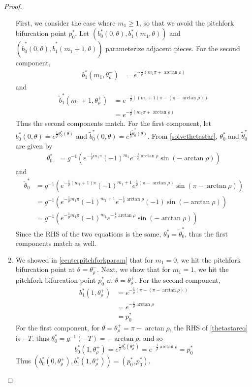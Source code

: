 \documentclass[thesis.tex]{subfiles}
\begin{document}
\begin{lemma}
\begin{proof}
\begin{enumerate}
	First, we consider the case where $m_1 \geq 1$, so that we avoid the pitchfork bifurcation point $p_0^*$. Let $(b^*_0(0, \theta), b^*_1(m_1, \theta))$ and $(\tilde{b}^*_0(0, \theta), \tilde{b}^*_1(m_1 + 1, \theta))$ parameterize adjacent pieces. For the second component,
	\begin{align*}
	b_1^*(m_1, \theta_\rho^-) &= e^{ -\frac{1}{\rho}(m_1 \pi + \arctan \rho) }
	\end{align*}
	and
	\begin{align*}
	\tilde{b}_1^*(m_1 + 1, \theta_\rho^+) 
	&= e^{ -\frac{1}{\rho}((m_1+1) \pi - (\pi - \arctan \rho)) } \\
	&= e^{ -\frac{1}{\rho}(m_1 \pi + \arctan \rho) }
	\end{align*}
	Thus the second components match. For the first component, let $b_0^*(0, \theta) = e^{ \frac{1}{\rho} \theta_0^*(\theta) }$ and $\tilde{b}_0^*(0, \theta) = e^{ \frac{1}{\rho} \tilde{\theta}_0^*(\theta) }$. From \eqref{solvethetastar}, $\theta_0^*$ and $\tilde{\theta}_0^*$ are given by
	\begin{align*}
	\theta_0^* &= g^{-1}\left( e^{ -\frac{1}{\rho} m_1 \pi } (-1)^{m_1}  e^{ -\frac{1}{\rho} \arctan \rho } \sin(-\arctan \rho) \right)
	\end{align*}
	and
	\begin{align*}
	\tilde{\theta}_0^* &= g^{-1}\left( e^{ -\frac{1}{\rho} (m_1+1) \pi } (-1)^{m_1+1}  e^{ \frac{1}{\rho} (\pi - \arctan \rho) } \sin(\pi - \arctan \rho) \right) \\
	&= g^{-1}\left( e^{ -\frac{1}{\rho} m_1 \pi } (-1)^{m_1+1} e^{-\frac{1}{\rho} \arctan \rho } (-1) \sin(- \arctan \rho) \right) \\
	&= g^{-1}\left( e^{ -\frac{1}{\rho} m_1 \pi } (-1)^{m_1} e^{-\frac{1}{\rho} \arctan \rho } \sin(-\arctan \rho) \right)
	\end{align*}
	Since the RHS of the two equations is the same, $\theta_0^* = \tilde{\theta}_0^*$, thus the first components match as well.

	\item We showed in \eqref{centerpitchforkparam} that for $m_1 = 0$, we hit the pitchfork bifurcation point at $\theta = \theta_\rho^-$. Next, we show that for $m_1 = 1$, we hit the pitchfork bifurcation point $p_0^*$ at $\theta = \theta_\rho^+$. 
	For the second component, 
	\begin{align*}
	b_1^*(1, \theta_\rho^+) &= e^{-\frac{1}{\rho}(\pi - (\pi - \arctan \rho)) } \\
	&= e^{ -\frac{1}{\rho} \arctan \rho } \\
	&= p_0^*
	\end{align*}
	For the first component, for $\theta = \theta_\rho^+ = \pi -\arctan \rho$, the RHS of \eqref{thetastareq} is $-T$, thus $\theta_0^* = g^{-1}(-T) = -\arctan \rho$, and so 
	\[
	b_0^*(1, \theta_\rho^+) = e^{ \frac{1}{\rho} \theta_0^*(\theta_\rho^+)} = e^{ -\frac{1}{\rho} \arctan \rho } = p_0^*
	\]
	Thus $(b_0^*(0, \theta_\rho^+), b_1^*(1, \theta_\rho^+)) = (p_0^*,p_0^*).$


\end{enumerate}
\end{proof}
\end{lemma}
\end{document}
